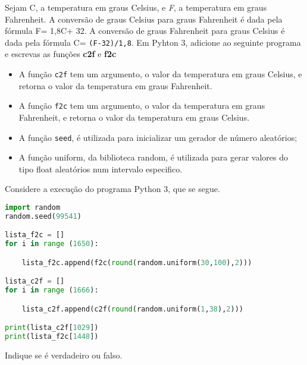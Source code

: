 \documentclass[12pt,varwidth=16cm,border=17pt]{standalone}
\begin{document}
Sejam C, a temperatura em graus Celsius, e \emph{F}, a temperatura em graus Fahrenheit. A conversão de graus Celsius para graus Fahrenheit é dada pela fórmula F= 1,8C+ 32. A conversão de graus Fahrenheit para graus Celsius é dada pela fórmula C= \verb+(F-32)/1,8+.
Em Pyhton 3, adicione ao seguinte programa e escrevas as funções \textbf{c2f} e \textbf{f2c} 


\begin{itemize}
    
  \item A função \verb+c2f+ tem um argumento, o valor da temperatura em graus Celsius, e retorna o valor da temperatura em graus Fahrenheit.
  
  \item  A função \verb+f2c+ tem um argumento, o valor da temperatura em graus Fahrenheit, e retorna o valor da temperatura em graus Celsius.

  \item A função \verb+seed+, é utilizada para inicializar um gerador de número aleatórios;
  
  \item A função uniform, da biblioteca random, é utilizada para gerar valores do tipo float aleatórios num intervalo especifico.

    
\end{itemize}




Considere a execução do programa Python 3, que se segue. 

\begin{lstlisting}[language=Python]
import random
random.seed(99541)

lista_f2c = []
for i in range (1650):

    lista_f2c.append(f2c(round(random.uniform(30,100),2)))

lista_c2f = []
for i in range (1666):

    lista_c2f.append(c2f(round(random.uniform(1,38),2)))

print(lista_c2f[1029])
print(lista_f2c[1448])
\end{lstlisting}

Indique se é verdadeiro ou falso.
\end{document}
